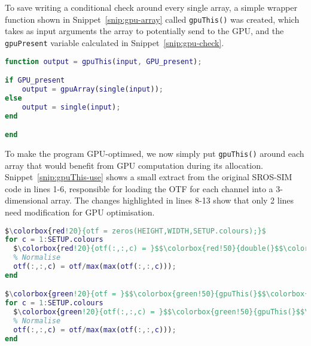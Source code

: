 To save writing a conditional check around every single array, a simple wrapper function shown in Snippet~\ref{snip:gpu-array} called \texttt{gpuThis()} was created, which takes as input arguments the array to potentially send to the GPU, and the \texttt{gpuPresent} variable calculated in Snippet~\ref{snip:gpu-check}.

\begin{lstfloat}
\begin{lstlisting}[language=matlab,caption={A simple helper function, \texttt{gpuThis()}, sends an array to graphics memory if a GPU is available, but leaves the array in CPU memory if not},label={snip:gpu-array},frame=single]
function output = gpuThis(input, GPU_present);

if GPU_present
    output = gpuArray(single(input));
else
    output = single(input);
end

end
\end{lstlisting}
\end{lstfloat}

To make the program GPU-optimsed, we now simply put \texttt{gpuThis()} around each array that would benefit from GPU computation during its allocation. 
Snippet~\ref{snip:gpuThis-use} shows a small extract from the original SROS-SIM code in lines 1-6, responsible for loading the OTF for each channel into a 3-dimensional array. 
The changes highlighted in lines 8-13 show that only 2 lines need modification for GPU optimisation. 

\setlength\fboxsep{0pt}
\begin{lstfloat}
\begin{lstlisting}[language=matlab,caption={The function \texttt{gpuThis()} should be wrapped around new arrays when they are preallocated},label={snip:gpuThis-use},frame=single,escapechar=$]
$\colorbox{red!20}{otf = zeros(HEIGHT,WIDTH,SETUP.colours);}$
for c = 1:SETUP.colours
  $\colorbox{red!20}{otf(:,:,c) = }$$\colorbox{red!50}{double(}$$\colorbox{red!20}{imread([DATA.OTF\_path\{c\}, DATA.OTF\_name\{c\}, DATA.OTF\_suffix\{c\}]));}$
  % Normalise
  otf(:,:,c) = otf/max(max(otf(:,:,c)));
end

$\colorbox{green!20}{otf = }$$\colorbox{green!50}{gpuThis(}$$\colorbox{green!20}{zeros(HEIGHT,WIDTH,SETUP.colours)}$$\colorbox{green!50}{, gpuPresent)}$$\colorbox{green!20}{;}$
for c = 1:SETUP.colours
  $\colorbox{green!20}{otf(:,:,c) = }$$\colorbox{green!50}{gpuThis(}$$\colorbox{green!20}{imread([DATA.OTF\_path\{c\}, DATA.OTF\_name\{c\}, DATA.OTF\_suffix\{c\}])}$$\colorbox{green!50}{, gpuPresent}$$\colorbox{green!20}{);}$
  % Normalise
  otf(:,:,c) = otf/max(max(otf(:,:,c)));
end
\end{lstlisting}
\end{lstfloat}


